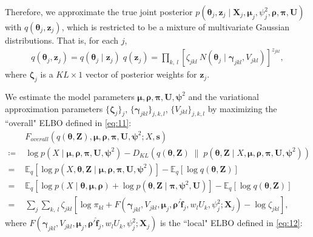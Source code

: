 \documentclass[onefignum,onetabnum,oneeqnum,final]{siamart190516}
\begin{document}
Therefore, we approximate the true joint posterior $p\left(\bm{\theta}_j, \bm{z}_j \mid \bm{X}_j, \bm{\mu}_j, \psi_j^2, \bm{\rho}, \bm{\pi}, \bm{U} \right)$ with $q(\bm{\theta}_j, \bm{z}_j)$, which is restricted to be a mixture of multivariate Gaussian distributions. That is,  for each $j$,
\begin{align} 
q(\bm{\theta}_j, \bm{z}_j) = q(\bm{\theta}_j \mid \bm{z}_j) \; q(\bm{z}_j) = \prod_{k, \: l}  \left[\zeta_{jkl} \: N(\bm{\theta}_j \mid \bm{\gamma}_{jkl}, V_{jkl}) \right]^{z_{jkl}}, \label{eq:10}
\end{align}
where $\bm{\zeta}_j$ is a $KL \times 1$ vector of posterior weights for $\bm{z}_j$. 


We estimate the model parameters $\bm{\mu}, \bm{\rho}, \bm{\pi}, \bm{U}, \bm{\psi}^2$ and the variational approximation parameters $\{\bm{\zeta}_j\}_j$,  $\{\bm{\gamma}_{jkl}\}_{j, k, l}$, $\{V_{jkl}\}_{j, k, l}$ by maximizing the ``overall" ELBO defined in \eqref{eq:11}:
\begin{align} \label{eq:11}
& \; F_{overall}\left(q(\bm{\theta}, \bm{Z}), \bm{\mu}, \bm{\rho}, \bm{\pi}, \bm{U}, \bm{\psi}^2;  X, \bm{s} \right) \\
 \coloneqq & \; \log p\left(X \mid \bm{\mu},  \bm{\rho}, \bm{\pi}, \bm{U},  \bm{\psi}^2 \right) - D_{KL} \left(q(\bm{\theta}, \bm{Z}) \; \lVert \;  p\left(\bm{\theta}, \bm{Z} \mid X, \bm{\mu}, \bm{\rho}, \bm{\pi}, \bm{U}, \bm{\psi}^2 \right) \right) \\
 = & \; \mathbb{E}_q \left[ \log p(X,  \bm{\theta}, \bm{Z} \mid  \bm{\mu}, \bm{\rho}, \bm{\pi}, \bm{U},  \bm{\psi}^2 ) \right] -  \mathbb{E}_q \left[ \log q(\bm{\theta},  \bm{Z}) \right]  \\
 = & \; \mathbb{E}_q \left[ \log p(X \mid \bm{\theta}, \bm{\mu}, \bm{\rho}) + \log p(\bm{\theta}, \bm{Z} \mid \bm{\pi}, \bm{\psi}^2, \bm{U}) \right] -  \mathbb{E}_q \left[ \log q(\bm{\theta}, \bm{Z}) \right]  \\
 = & \; \sum_j \sum_{k, \: l} \zeta_{jkl} \left[\log \pi_{kl} + F\left(\bm{\gamma}_{jkl},  V_{jkl}, \bm{\mu}_j, \bm{\rho}' \hat{\bm{f}}_j,  w_l U_k, \psi_j^2;  \bm{X}_j \right) - \log \zeta_{jkl} \right],
\end{align}
where $F\left(\bm{\gamma}_{jkl},  V_{jkl}, \bm{\mu}_j, \bm{\rho}' \hat{\bm{f}}_j, w_l U_k, \psi_j^2;  \bm{X}_j \right)$ is the ``local" ELBO defined in \eqref{eq:12}:
\end{document}
